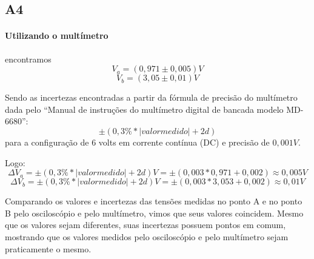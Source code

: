     \subsection{A4}
        \paragraph{Utilizando o multímetro} encontramos 
        $$V_a = (0,971 \pm 0,005) V$$
        $$V_b = (3,05 \pm  0,01) V$$
        
        Sendo as incertezas encontradas a partir 
        da fórmula de precisão do multímetro dada 
        pelo “Manual de instruções do multímetro 
        digital de bancada modelo MD-6680”: 
        $$\pm(0,3\% * |valor medido| + 2d)$$
        para a configuração de 6 volts em 
        corrente contínua (DC) e precisão de 
        $0,001 V$.
        \newline
        
        Logo: 
        $$\Delta V_a = \pm(0,3\% * |valor medido| + 2d) V = \pm(0,003*0,971 + 0,002) \approx 0,005 V$$
        $$\Delta V_b = \pm(0,3\% * |valor medido| + 2d) V = \pm(0,003*3,053 + 0,002) \approx 0,01 V$$

        Comparando os valores e incertezas das 
        tensões medidas no ponto A e no ponto B 
        pelo osciloscópio e pelo multímetro, 
        vimos que seus valores coincidem. 
        Mesmo que os valores sejam diferentes, 
        suas incertezas possuem pontos em comum, 
        mostrando que os valores medidos pelo 
        osciloscópio e pelo multímetro sejam 
        praticamente o mesmo.